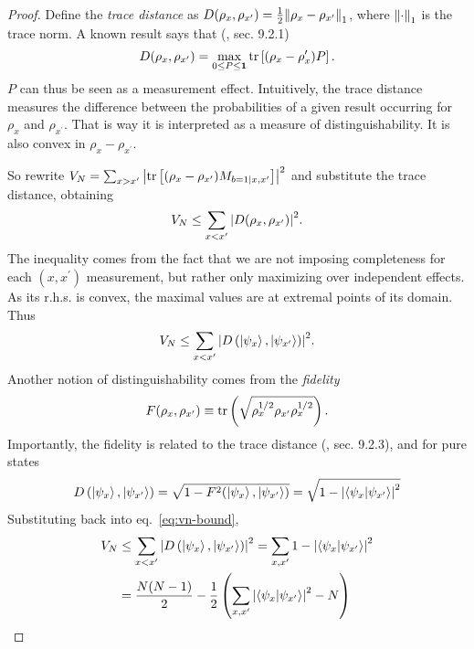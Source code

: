     \moremeasurements*
    \begin{proof}
        Define the \emph{trace distance} as $D(\rho_x, \rho_{x^\prime}) = \frac{1}{2} \norm{\rho_x - \rho_{x^\prime}}_1$, where $\norm{\cdot}_1$ is the trace norm. A known result says that (\cite{nielsen_chuang_book}, sec. 9.2.1)
        $$
            D(\rho_x, \rho_{x^\prime}) = \max_{0 \leq P \leq \mathbf{1}} \text{tr}\left[ (\rho_x - \rho_x^{\prime}) P \right] .
        $$
        $P$ can thus be seen as a measurement effect. Intuitively, the trace distance measures the difference between the probabilities of a given result occurring for $\rho_x$ and $\rho_{x^\prime}$. That is way it is interpreted as a measure of distinguishability. It is also convex in $\rho_x - \rho_{x^\prime}$.

        So rewrite $V_N = \sum_{x > x^\prime} \abs{ \text{tr}\left[ (\rho_x - \rho_{x^\prime}) M_{b=1 \mid x,x^\prime} \right]}^2$ and substitute the trace distance, obtaining
        $$
            V_N \leq \sum_{x < x^\prime} \abs{ D(\rho_x, \rho_{x^\prime}) }^2 .
        $$
        The inequality comes from the fact that we are not imposing completeness for each $(x,x^\prime)$ measurement, but rather only maximizing over independent effects. As its r.h.s. is convex, the maximal values are at extremal points of its domain. Thus
        \begin{equation}
            V_N \leq \sum_{x < x^\prime} \abs{ D\left( \ket{\psi_x}, \ket{\psi_{x^\prime}} \right) }^2 .
            \label{eq:vn-bound}
        \end{equation}
        Another notion of distinguishability comes from the \emph{fidelity}
        $$
            F(\rho_x, \rho_{x^\prime}) \equiv \text{tr}\left( \sqrt{\rho_x^{1/2} \rho_{x^\prime} \rho_x^{1/2}} \right).
        $$
        Importantly, the fidelity is related to the trace distance (\cite{nielsen_chuang_book}, sec. 9.2.3), and for pure states   
        $$
            D\left( \ket{\psi_x}, \ket{\psi_{x^\prime}} \right) = \sqrt{1 - F^2(\ket{\psi_x}, \ket{\psi_{x^\prime}})} = \sqrt{1 - \abs{\braket{\psi_x}{\psi_{x^\prime}}}^2}
        $$
        Substituting back into eq.~\eqref{eq:vn-bound},
        \begin{align*}
            V_N & \leq \sum_{x < x^\prime} \abs{ D\left( \ket{\psi_x}, \ket{\psi_{x^\prime}} \right) }^2
            = \sum_{x, x^\prime} 1 - \abs{\braket{\psi_x}{\psi_{x^\prime}}}^2 \\
            &= \frac{N(N-1)}{2} - \frac{1}{2} \left( \sum_{x, x^\prime} \abs{\braket{\psi_x}{\psi_{x^\prime}}}^2 - N \right) \\

\end{align*}
\end{proof}
